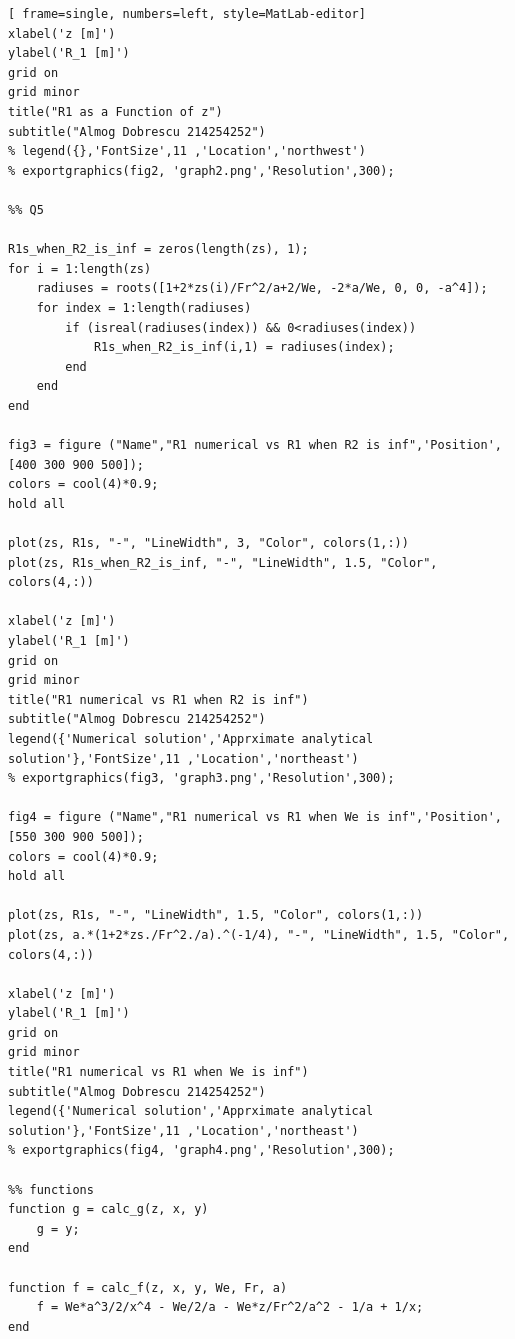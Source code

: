 \documentclass[11pt, a4paper]{article}
\begin{document}
\begin{lstlisting}[ frame=single, numbers=left, style=MatLab-editor]
xlabel('z [m]')
ylabel('R_1 [m]')
grid on
grid minor
title("R1 as a Function of z")
subtitle("Almog Dobrescu 214254252")
% legend({},'FontSize',11 ,'Location','northwest')
% exportgraphics(fig2, 'graph2.png','Resolution',300);

%% Q5

R1s_when_R2_is_inf = zeros(length(zs), 1);
for i = 1:length(zs)
    radiuses = roots([1+2*zs(i)/Fr^2/a+2/We, -2*a/We, 0, 0, -a^4]);
    for index = 1:length(radiuses) 
        if (isreal(radiuses(index)) && 0<radiuses(index))
            R1s_when_R2_is_inf(i,1) = radiuses(index);
        end
    end
end

fig3 = figure ("Name","R1 numerical vs R1 when R2 is inf",'Position',[400 300 900 500]);
colors = cool(4)*0.9;
hold all

plot(zs, R1s, "-", "LineWidth", 3, "Color", colors(1,:))
plot(zs, R1s_when_R2_is_inf, "-", "LineWidth", 1.5, "Color", colors(4,:))

xlabel('z [m]')
ylabel('R_1 [m]')
grid on
grid minor
title("R1 numerical vs R1 when R2 is inf")
subtitle("Almog Dobrescu 214254252")
legend({'Numerical solution','Apprximate analytical solution'},'FontSize',11 ,'Location','northeast')
% exportgraphics(fig3, 'graph3.png','Resolution',300);

fig4 = figure ("Name","R1 numerical vs R1 when We is inf",'Position',[550 300 900 500]);
colors = cool(4)*0.9;
hold all

plot(zs, R1s, "-", "LineWidth", 1.5, "Color", colors(1,:))
plot(zs, a.*(1+2*zs./Fr^2./a).^(-1/4), "-", "LineWidth", 1.5, "Color", colors(4,:))

xlabel('z [m]')
ylabel('R_1 [m]')
grid on
grid minor
title("R1 numerical vs R1 when We is inf")
subtitle("Almog Dobrescu 214254252")
legend({'Numerical solution','Apprximate analytical solution'},'FontSize',11 ,'Location','northeast')
% exportgraphics(fig4, 'graph4.png','Resolution',300);

%% functions
function g = calc_g(z, x, y)
    g = y;
end

function f = calc_f(z, x, y, We, Fr, a)
    f = We*a^3/2/x^4 - We/2/a - We*z/Fr^2/a^2 - 1/a + 1/x;
end
\end{lstlisting}
\end{document}
